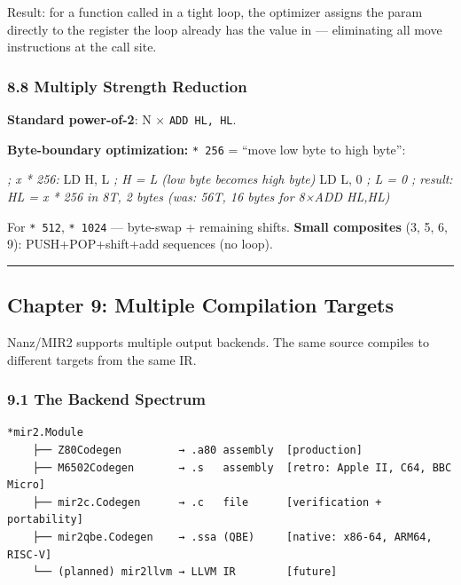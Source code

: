 \documentclass[
  11pt,
]{article}
\newenvironment{Shaded}{}{}
\newcommand{\CommentTok}[1]{\textcolor[rgb]{0.38,0.63,0.69}{\textit{#1}}}
\newcommand{\DecValTok}[1]{\textcolor[rgb]{0.25,0.63,0.44}{#1}}
\newcommand{\NormalTok}[1]{#1}
\newcommand{\OperatorTok}[1]{\textcolor[rgb]{0.40,0.40,0.40}{#1}}
\begin{document}
Result: for a function called in a tight loop, the optimizer assigns the
param directly to the register the loop already has the value in ---
eliminating all move instructions at the call site.

\subsubsection{8.8 Multiply Strength
Reduction}\label{multiply-strength-reduction}

\textbf{Standard power-of-2}: N × \texttt{ADD\ HL,\ HL}.

\textbf{Byte-boundary optimization:} \texttt{*\ 256} = ``move low byte
to high byte'':

\begin{Shaded}
\begin{Highlighting}[]
\CommentTok{; x * 256:}
\NormalTok{LD H}\OperatorTok{,}\NormalTok{ L     }\CommentTok{; H = L (low byte becomes high byte)}
\NormalTok{LD L}\OperatorTok{,} \DecValTok{0}     \CommentTok{; L = 0}
\CommentTok{; result: HL = x * 256 in 8T, 2 bytes (was: 56T, 16 bytes for 8×ADD HL,HL)}
\end{Highlighting}
\end{Shaded}

For \texttt{*\ 512}, \texttt{*\ 1024} --- byte-swap + remaining shifts.
\textbf{Small composites} (3, 5, 6, 9): PUSH+POP+shift+add sequences (no
loop).

\begin{center}\rule{0.5\linewidth}{0.5pt}\end{center}

\subsection{Chapter 9: Multiple Compilation
Targets}\label{chapter-9-multiple-compilation-targets}

Nanz/MIR2 supports multiple output backends. The same source compiles to
different targets from the same IR.

\subsubsection{9.1 The Backend Spectrum}\label{the-backend-spectrum}

\begin{verbatim}
*mir2.Module
    ├── Z80Codegen         → .a80 assembly  [production]
    ├── M6502Codegen       → .s   assembly  [retro: Apple II, C64, BBC Micro]
    ├── mir2c.Codegen      → .c   file      [verification + portability]
    ├── mir2qbe.Codegen    → .ssa (QBE)     [native: x86-64, ARM64, RISC-V]
    └── (planned) mir2llvm → LLVM IR        [future]
\end{verbatim}
\end{document}
